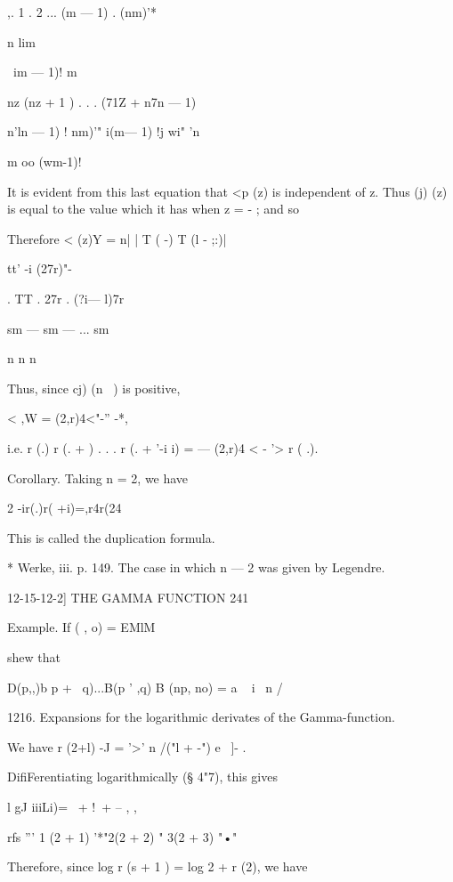 ,. 1 . 2 ... (m — 1) . (nm)'*  

n lim 



\ im — 1)!  m 



nz (nz + 1 ) . . . (71Z + n7n — 1) 



 n'ln — 1) !  nm)'" 
i(m— 1) !j wi"  'n 



m oo (wm-1)! 



It is evident from this last equation that <p (z) is independent of z. 
Thus (j) (z) is equal to the value which it has when z = - ; and so 

Therefore  <  (z)Y = n| | T ( -) T (l - ;:)| 

tt' -i (27r)"-  



. TT . 27r . (?i— l)7r 

sm — sm — ... sm 



n n n 

Thus, since cj) (n~ ) is positive, 

< ,W = (2,r)4<"-'' -*, 

i.e. r (.) r (. +  ) . . . r (. + '-i i) =    — (2,r)4 <  - '> r ( .). 

Corollary. Taking n = 2, we have   

2 -ir(.)r( +i)=,r4r(24 

This is called the duplication formula. 

* Werke, iii. p. 149. The case in which n — 2 was given by Legendre. 



12-15-12-2] THE GAMMA FUNCTION 241 

Example. If   (  , o) = EMlM 

shew that 

D(p,,)b p + \ q)...B(p ' ,q) 
B (np, no) = a ~    i   \ n / 

1216. Expansions for the logarithmic derivates of the Gamma-function. 

We have  r (2+l) -J =  '>'  n /("l + -") e~ ]- . 

DifiFerentiating logarithmically (§ 4"7), this gives 

l gJ iiiLi)= \  + !\  + -- ,   , 

rfs '''  1 (2 + 1) '*"2(2 + 2) " 3(2 + 3) "•"     

Therefore, since log r (s + 1 ) = log 2 + r (2), we have 

